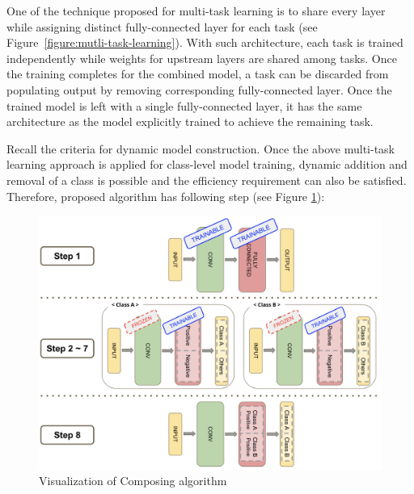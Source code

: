 \documentclass{article}
\begin{document}
One of the technique proposed for multi-task learning is to share every layer while assigning distinct fully-connected layer for each task (see Figure~\ref{figure:mutli-task-learning}). With such architecture, each task is trained independently while weights for upstream layers are shared among tasks. Once the training completes for the combined model, a task can be discarded from populating output by removing corresponding fully-connected layer. Once the trained model is left with a single fully-connected layer, it has the same architecture as the model explicitly trained to achieve the remaining task.

Recall the criteria for dynamic model construction. Once the above multi-task learning approach is applied for class-level model training, dynamic addition and removal of a class is possible and the efficiency requirement can also be satisfied. Therefore, proposed algorithm has following step (see Figure \ref{figure:composing_algo}):


\begin{figure}[t]
    \centering
    \includegraphics[scale=0.3,trim={0mm 0mm 0mm 0mm},clip]{composing_algo.png}
    \caption{Visualization of Composing algorithm}
    \label{figure:composing_algo}
\end{figure}
\end{document}
